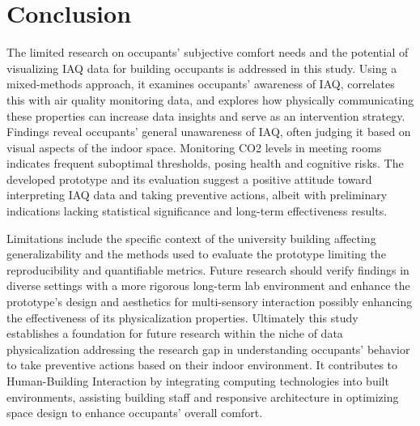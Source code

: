 \section{Conclusion}
\label{sec:conclusion}

The limited research on occupants' subjective comfort needs and the potential of visualizing IAQ data for building occupants is addressed in this study. Using a mixed-methods approach, it examines occupants' awareness of IAQ, correlates this with air quality monitoring data, and explores how physically communicating these properties can increase data insights and serve as an intervention strategy. Findings reveal occupants' general unawareness of IAQ, often judging it based on visual aspects of the indoor space. Monitoring CO2 levels in meeting rooms indicates frequent suboptimal thresholds, posing health and cognitive risks. The developed prototype and its evaluation suggest a positive attitude toward interpreting IAQ data and taking preventive actions, albeit with preliminary indications lacking statistical significance and long-term effectiveness results. 

Limitations include the specific context of the university building affecting generalizability and the methods used to evaluate the prototype limiting the reproducibility and quantifiable metrics. Future research should verify findings in diverse settings with a more rigorous long-term lab environment and enhance the prototype's design and aesthetics for multi-sensory interaction possibly enhancing the effectiveness of its physicalization properties. Ultimately this study establishes a foundation for future research within the niche of data physicalization addressing the research gap in understanding occupants' behavior to take preventive actions based on their indoor environment.  It contributes to Human-Building Interaction by integrating computing technologies into built environments, assisting building staff and responsive architecture in optimizing space design to enhance occupants' overall comfort.

\newpage